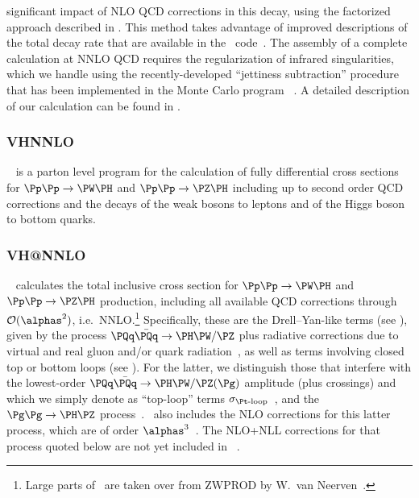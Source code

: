 significant impact of NLO QCD corrections in this decay, using the factorized approach
described in .  This method takes advantage
of improved descriptions of the total decay rate that are available in the \HDECAY\ code~\cite{Djouadi:1997yw}.
The assembly of a complete calculation at NNLO QCD requires the regularization of infrared singularities,
which we handle using the recently-developed ``jettiness subtraction''
procedure~\cite{Gaunt:2015pea,Boughezal:2015dva,Boughezal:2015aha,Boughezal:2015ded}
that has been implemented in the Monte Carlo program \MCFM~\cite{Campbell:1999ah,Campbell:2011bn,Campbell:2015qma}.
A detailed description of our calculation can be found in .


\subsubsection{VHNNLO}

\vhnnlo~\cite{Ferrera:2011bk,Ferrera:2013yga,Ferrera:2014lca} is a parton level
program for the calculation of fully differential cross sections for $\Pp\Pp\to\PW\PH$
and $\Pp\Pp\to\PZ\PH$ including up to second order QCD corrections and the decays
of the weak bosons to leptons and of the Higgs boson to bottom quarks. 

\subsubsection{VH@NNLO}

\VHNNLO~\cite{Brein:2012ne,Harlander:2013mla} calculates the total
inclusive cross section for $\Pp\Pp\to\PW\PH$ and $\Pp\Pp\to\PZ\PH$
production, including all available QCD corrections through ${\cal
O}(\alphas^2)$, i.e.\ NNLO.\footnote{Large parts of \VHNNLO\ are taken
over from {\sc ZWPROD} by W.~van Neerven~\cite{Hamberg:1990np}.}
Specifically, these are the Drell--Yan-like terms (see ), given by the
process $\PQq\bar\PQq\to\PH\PW/\PZ$ plus radiative corrections due to
virtual and real gluon and/or quark
radiation~\cite{Hamberg:1990np,Brein:2003wg}, as well as terms involving
closed top or bottom loops (see ). For the latter, we distinguish those that
interfere with the lowest-order $\PQq\bar\PQq\to\PH\PW/\PZ(\Pg)$ amplitude
(plus crossings) and which we simply denote as ``top-loop'' terms
$\sigma_{\Pt\mbox{\scriptsize -loop}}$~\cite{Brein:2011vx}, and the
$\Pg\Pg\to\PH\PZ$
process~\cite{Kniehl:1990iv,Dicus:1988yh,Brein:2003wg,Kniehl:2011aa}.
\VHNNLO\
also includes the NLO corrections for this latter process, which are of
order $\alphas^3$~\cite{Altenkamp:2012sx}. The NLO+NLL corrections for
that process quoted below are not yet included
in \VHNNLO~\cite{Harlander:2014wda}.

